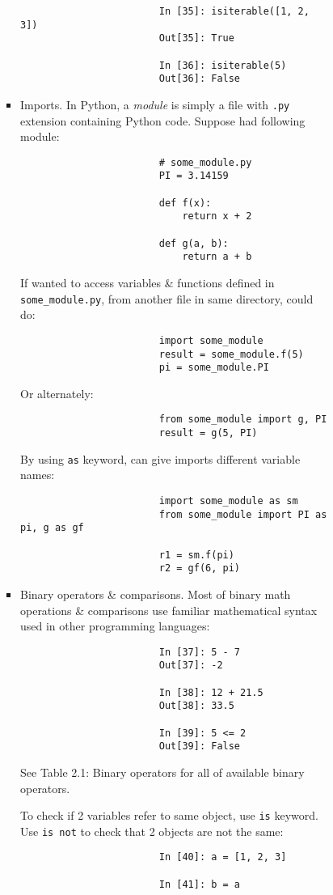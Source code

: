\documentclass{article}
\begin{document}
\begin{enumerate}
\begin{itemize}
\begin{itemize}
\begin{itemize}
\begin{itemize}
\begin{verbatim}
						In [35]: isiterable([1, 2, 3])
						Out[35]: True
						
						In [36]: isiterable(5)
						Out[36]: False
					\end{verbatim}
					\item {\sf Imports.} In Python, a {\it module} is simply a file with {\tt.py} extension containing Python code. Suppose had following module:
					\begin{verbatim}
						# some_module.py
						PI = 3.14159
						
						def f(x):
						    return x + 2
						    
						def g(a, b):
						    return a + b
					\end{verbatim}
					If wanted to access variables \& functions defined in \verb|some_module.py|, from another file in same directory, could do:
					\begin{verbatim}
						import some_module
						result = some_module.f(5)
						pi = some_module.PI
					\end{verbatim}
					Or alternately:
					\begin{verbatim}
						from some_module import g, PI
						result = g(5, PI)
					\end{verbatim}
					By using {\tt as} keyword, can give imports different variable names:
					\begin{verbatim}
						import some_module as sm
						from some_module import PI as pi, g as gf
						
						r1 = sm.f(pi)
						r2 = gf(6, pi)
					\end{verbatim}
					\item {\sf Binary operators \& comparisons.} Most of binary math operations \& comparisons use familiar mathematical syntax used in other programming languages:
					\begin{verbatim}
						In [37]: 5 - 7
						Out[37]: -2
						
						In [38]: 12 + 21.5
						Out[38]: 33.5
						
						In [39]: 5 <= 2
						Out[39]: False
					\end{verbatim}
					See {\sf Table 2.1: Binary operators} for all of available binary operators.
					
					To check if 2 variables refer to same object, use {\tt is} keyword. Use {\tt is not} to check that 2 objects are not the same:
					\begin{verbatim}
						In [40]: a = [1, 2, 3]
						
						In [41]: b = a
						

\end{verbatim}
\end{itemize}
\end{itemize}
\end{itemize}
\end{itemize}
\end{enumerate}
\end{document}
